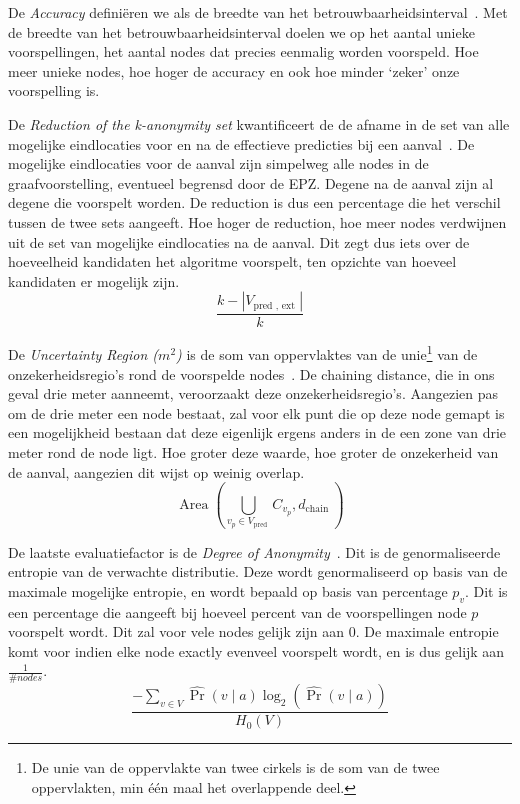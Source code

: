 De \textit{Accuracy} definiëren we als de breedte van het
betrouwbaarheidsinterval~\cite{Dhondt, Verdonck_2022}. Met de breedte van het
betrouwbaarheidsinterval doelen we op het aantal unieke voorspellingen, het
aantal nodes dat precies eenmalig worden voorspeld. Hoe meer unieke nodes, hoe
hoger de accuracy en ook hoe minder `zeker' onze voorspelling is.

De \textit{Reduction of the k-anonymity set} kwantificeert de de afname in de
set van alle mogelijke eindlocaties voor en na de effectieve predicties bij een
aanval~\cite{Dhondt, Verdonck_2022}. De mogelijke eindlocaties voor de aanval
zijn simpelweg alle nodes in de graafvoorstelling, eventueel begrensd door de
\ac{EPZ}. Degene na de aanval zijn al degene die voorspelt worden. De reduction
is dus een percentage die het verschil tussen de twee sets aangeeft. Hoe hoger
de reduction, hoe meer nodes verdwijnen uit de set van mogelijke eindlocaties
na de aanval. Dit zegt dus iets over de hoeveelheid kandidaten het algoritme
voorspelt, ten opzichte van hoeveel kandidaten er mogelijk zijn.
\begin{equation}
    \frac{k-\left|V_{\text {pred }, \text { ext }}\right|}{k}\label{eq:reduction}
\end{equation}

De \textit{Uncertainty Region ($m^2$)} is de som van oppervlaktes van de
unie\footnote{De unie van de oppervlakte van twee cirkels is de som van de twee
    oppervlakten, min één maal het overlappende deel.} van de onzekerheidsregio's
rond de voorspelde nodes~\cite{Dhondt,Verdonck_2022}. De chaining distance, die
in ons geval drie meter aanneemt, veroorzaakt deze onzekerheidsregio's.
Aangezien pas om de drie meter een node bestaat, zal voor elk punt die op deze
node gemapt is een mogelijkheid bestaan dat deze eigenlijk ergens anders in de
een zone van drie meter rond de node ligt. Hoe groter deze waarde, hoe groter
de onzekerheid van de aanval, aangezien dit wijst op weinig overlap.
\begin{equation}
    \operatorname{Area}\left(\bigcup_{v_p \in V_{\text {pred }}} C_{v_p}, d_{\text {chain }}\right)\label{eq:uncertainty}
\end{equation}

De laatste evaluatiefactor is de \textit{Degree of
    Anonymity}~\cite{Dhondt,Verdonck_2022}. Dit is de genormaliseerde entropie van
de verwachte distributie. Deze wordt genormaliseerd op basis van de maximale
mogelijke entropie, en wordt bepaald op basis van percentage $p_v$. Dit is een
percentage die aangeeft bij hoeveel percent van de voorspellingen node $p$
voorspelt wordt. Dit zal voor vele nodes gelijk zijn aan 0. De maximale
entropie komt voor indien elke node exactly evenveel voorspelt wordt, en is dus
gelijk aan $\frac{1}{\# nodes}$.
\begin{equation}
    \frac{-\sum_{v \in V} \widehat{\operatorname{Pr}}(v \mid a) \log _2(\widehat{\operatorname{Pr}}(v \mid a))}{H_0(V)}\label{eq:degree_of_anonymity}
\end{equation}

